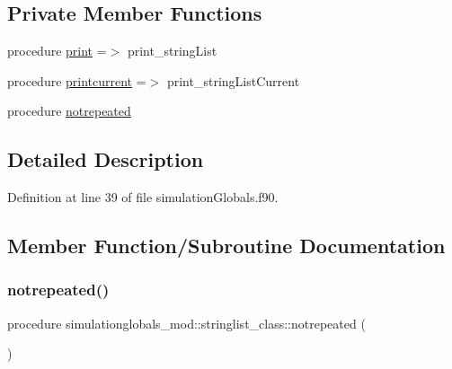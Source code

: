 \subsection*{Private Member Functions}
\begin{DoxyCompactItemize}
\item 
procedure \mbox{\hyperlink{structsimulationglobals__mod_1_1stringlist__class_a8d55a96a0efd13171bf28964643f4a1f}{print}} =$>$ print\+\_\+string\+List
\item 
procedure \mbox{\hyperlink{structsimulationglobals__mod_1_1stringlist__class_ab5ad464b1447099e5b68f90ad0de14bc}{printcurrent}} =$>$ print\+\_\+string\+List\+Current
\item 
procedure \mbox{\hyperlink{structsimulationglobals__mod_1_1stringlist__class_a0ee6cc7184a0f46db05daffdcb47a2ca}{notrepeated}}
\end{DoxyCompactItemize}


\subsection{Detailed Description}


Definition at line 39 of file simulation\+Globals.\+f90.



\subsection{Member Function/\+Subroutine Documentation}
\mbox{\label{structsimulationglobals__mod_1_1stringlist__class_a0ee6cc7184a0f46db05daffdcb47a2ca}} 
\subsubsection{\texorpdfstring{notrepeated()}{notrepeated()}}
{\footnotesize\ttfamily procedure simulationglobals\+\_\+mod\+::stringlist\+\_\+class\+::notrepeated (\begin{DoxyParamCaption}{ }\end{DoxyParamCaption})\hspace{0.3cm}{\ttfamily [private]}}



